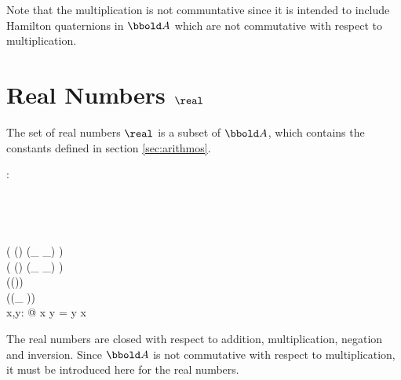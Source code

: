 \documentclass[12pt]{article}
\begin{document}
%
Note that the multiplication is not communtative since it is intended
to include Hamilton quaternions in $\arithmos$ which are not
commutative with respect to multiplication. 
%
\section{Real Numbers $\real$}
\label{sec:real-numbers}
The set of real numbers $\real$ is a subset of $\arithmos$, which
contains the constants defined in section \ref{sec:arithmos}.
%
\begin{axdef}
  \real : \power \arithmos\\
  \where
  \azero \in \real\\
  \aone \in \real\\
  \atwo \in \real\\
  \aten \in \real\\
  \ran ( (\real \cross \real) \dres (\_ \aplus \_) ) \subset \real\\
  \ran ( (\real \cross \real) \dres (\_ \amult \_) ) \subset \real\\
  \ran (\real \dres (\aneg ))  \subset \real\\
  \ran (\real \dres (\_ \ainv ))  \subset \real\\
  \forall x,y: \real @ x \amult y = y \amult x \\
\end{axdef}

The real numbers are closed with respect to addition, multiplication,
negation and inversion. Since $\arithmos$ is not commutative with
respect to multiplication, it must be introduced here for the real
numbers. 
\end{document}
